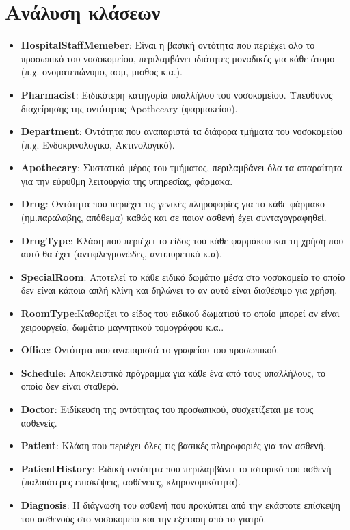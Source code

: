\documentclass{article}
\begin{document}
\section{Ανάλυση κλάσεων}

\begin{itemize}
    \item \textbf{HospitalStaffMemeber}: Είναι η βασική οντότητα που περιέχει όλο το προσωπικό του νοσοκομείου, περιλαμβάνει ιδιότητες μοναδικές για κάθε άτομο (π.χ. ονοματεπώνυμο, αφμ, μισθος κ.α.).
    \item \textbf{Pharmacist}: Ειδικότερη κατηγορία υπαλλήλου του νοσοκομείου. Υπεύθυνος διαχείρησης της οντότητας Apothecary (φαρμακείου).
    \item \textbf{Department}: Οντότητα που αναπαριστά τα διάφορα τμήματα του νοσοκομείου (π.χ. Ενδοκρινολογικό, Ακτινολογικό).
    \item \textbf{Apothecary}: Συστατικό μέρος του τμήματος, περιλαμβάνει όλα τα απαραίτητα για την εύρυθμη λειτουργία της υπηρεσίας, φάρμακα.
    \item \textbf{Drug}: Οντότητα που περιέχει τις γενικές πληροφορίες για το κάθε φάρμακο (ημ.παραλαβης, απόθεμα) καθώς και σε ποιον ασθενή έχει συνταγογραφηθεί.
    \item \textbf{DrugType}: Κλάση που περιέχει το είδος του κάθε φαρμάκου και τη χρήση που αυτό θα έχει (αντιφλεγμονώδες, αντιπυρετικό κ.α).
    \item \textbf{SpecialRoom}: Αποτελεί το κάθε ειδικό δωμάτιο μέσα στο νοσοκομείο το οποίο δεν είναι κάποια απλή κλίνη και δηλώνει το αν αυτό είναι διαθέσιμο για χρήση.
    \item \textbf{RoomType}:Καθορίζει το είδος του ειδικού δωματιού το οποίο μπορεί αν είναι χειρουργείο, δωμάτιο μαγνητικού τομογράφου κ.α..
    \item \textbf{Office}: Οντότητα που αναπαριστά το γραφείου του προσωπικού.
    \item \textbf{Schedule}: Αποκλειστικό πρόγραμμα για κάθε ένα από τους υπαλλήλους, το οποίο δεν είναι σταθερό.
    \item \textbf{Doctor}: Ειδίκευση της οντότητας του προσωπικού, συσχετίζεται με τους ασθενείς.
    \item \textbf{Patient}: Κλάση που περιέχει όλες τις βασικές πληροφοριές για τον ασθενή.
    \item \textbf{PatientHistory}: Ειδική οντότητα που περιλαμβάνει το ιστορικό του ασθενή (παλαιότερες επισκέψεις, ασθένειες, κληρονομικότητα).
    \item \textbf{Diagnosis}: Η διάγνωση του ασθενή που προκύπτει από την εκάστοτε επίσκεψη του ασθενούς στο νοσοκομείο και την εξέταση από το γιατρό.

\end{itemize}
\end{document}
